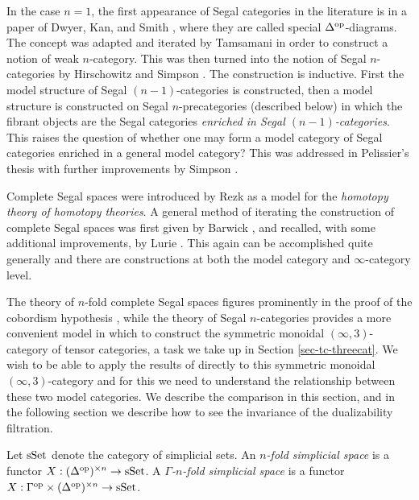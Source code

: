 \documentclass{amsart}
\begin{document}
In the case $n=1$, the first appearance of Segal categories in the literature is in a paper of Dwyer, Kan, and Smith \cite{MR984042}, where they are called special $\Delta^{\mathrm{op}}$-diagrams. The concept was adapted and iterated by Tamsamani \cite{Tamsamani:thesis} in order to construct a notion of weak $n$-category. This was then turned into the notion of Segal $n$-categories by Hirschowitz and Simpson \cite{9807049}. The construction is inductive.  First the model structure of Segal $(n-1)$-categories is constructed, then a model structure is constructed on Segal $n$-precategories (described below) in which the fibrant objects are the Segal categories {\em enriched in Segal $(n-1)$-categories}. This raises the question of whether one may form a model category of Segal categories enriched in a general model category? This was addressed in Pelissier's thesis \cite{Pelissier:thesis} with further improvements by Simpson \cite{1001.4071}.  

Complete Segal spaces were introduced by Rezk \cite{MR1804411} as a model for the {\em homotopy theory of homotopy theories}.  A general method of iterating the construction of complete Segal spaces was first given by Barwick \cite{Barwick:thesis}, and recalled, with some additional improvements, by Lurie \cite{0905.0462, MR2555928}. This again can be accomplished quite generally and there are constructions at both the model category and $\infty$-category level. 

The theory of $n$-fold complete Segal spaces figures prominently in the proof of the cobordism hypothesis \cite{MR2555928}, while the theory of Segal $n$-categories provides a more convenient model in which to construct the symmetric monoidal $(\infty,3)$-category of tensor categories, a task we take up in Section \ref{sec-tc-threecat}. We wish to be able to apply the results of \cite{MR2555928} directly to this symmetric monoidal $(\infty,3)$-category and for this we need to understand the relationship between these two model categories. We describe the comparison in this section, and in the following section we describe how to see the invariance of the dualizability filtration.  

\begin{definition}
	Let $\mathrm{sSet}$ denote the category of simplicial sets. An {\em $n$-fold simplicial space} is a functor $X: (\Delta^\textrm{op})^{\times n} \to \mathrm{sSet}$. A {\em $\Gamma$-$n$-fold simplicial space} is a functor $X: \Gamma^\textrm{op} \times (\Delta^\textrm{op})^{\times n} \to \mathrm{sSet}$.
\end{definition}
\end{document}
